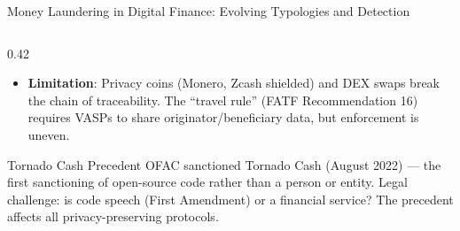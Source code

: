 \begin{frame}{Money Laundering in Digital Finance: Evolving Typologies and Detection}
\begin{columns}[T]
\begin{column}{0.42\textwidth}
\begin{itemize}
        \item \textbf{Limitation}: Privacy coins (Monero, Zcash shielded) and DEX swaps break the chain of traceability. The ``travel rule'' (FATF Recommendation 16) requires VASPs to share originator/beneficiary data, but enforcement is uneven.
      \end{itemize}
      \vspace{0.2em}
      \begin{alertblock}{Tornado Cash Precedent}
        OFAC sanctioned Tornado Cash (August 2022) --- the first sanctioning of open-source code rather than a person or entity. Legal challenge: is code speech (First Amendment) or a financial service? The precedent affects all privacy-preserving protocols.
      \end{alertblock}
    \end{column}
  \end{columns}
\end{frame}


